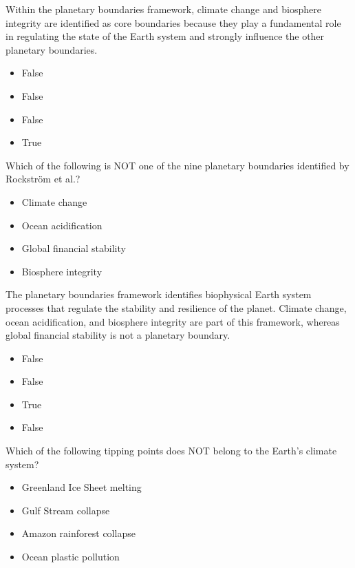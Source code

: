 \documentclass[
  a4paper,
  DIV=11,
  numbers=noendperiod,
  oneside,
  openany]{scrreprt}
\providecommand{\tightlist}{%
  \setlength{\itemsep}{0pt}\setlength{\parskip}{0pt}}
\begin{document}
Within the planetary boundaries framework, climate change and biosphere
integrity are identified as core boundaries because they play a
fundamental role in regulating the state of the Earth system and
strongly influence the other planetary boundaries.

\begin{itemize}
\tightlist
\item
  False
\item
  False
\item
  False
\item
  True
\end{itemize}

Which of the following is NOT one of the nine planetary boundaries
identified by Rockström et al.?

\begin{itemize}
\tightlist
\item[$\square$]
  Climate change
\item[$\square$]
  Ocean acidification
\item[$\square$]
  Global financial stability
\item[$\square$]
  Biosphere integrity
\end{itemize}

The planetary boundaries framework identifies biophysical Earth system
processes that regulate the stability and resilience of the planet.
Climate change, ocean acidification, and biosphere integrity are part of
this framework, whereas global financial stability is not a planetary
boundary.

\begin{itemize}
\tightlist
\item
  False
\item
  False
\item
  True
\item
  False
\end{itemize}

Which of the following tipping points does NOT belong to the Earth's
climate system?

\begin{itemize}
\tightlist
\item[$\square$]
  Greenland Ice Sheet melting
\item[$\square$]
  Gulf Stream collapse
\item[$\square$]
  Amazon rainforest collapse
\item[$\square$]
  Ocean plastic pollution
\end{itemize}
\end{document}
